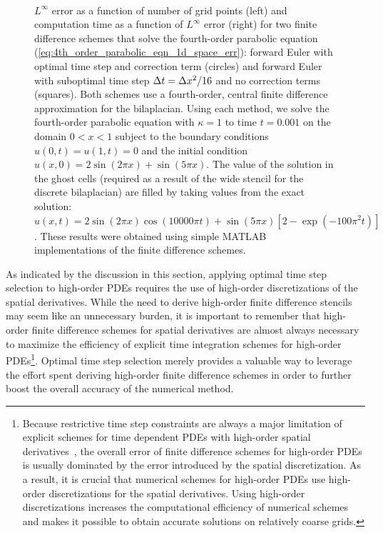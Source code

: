 \documentclass[oneeqnum,onefignum,onetabnum,onethmnum]{siamltex}
\begin{document}
\begin{figure}[tb]
\begin{center}
\ \ 
\caption{$L^\infty$ error as a function of number of grid points (left)
and computation time as a function of $L^\infty$ error (right) for two 
finite difference schemes that solve the fourth-order parabolic equation 
(\ref{eq:4th_order_parabolic_eqn_1d_space_err}):
forward Euler with optimal time step and correction term (circles)
and forward Euler with suboptimal time step $\Delta t = \Delta x^2/16$ and no 
correction terms (squares).
Both schemes use a fourth-order, central finite difference approximation for
the bilaplacian.  Using each method, we solve the fourth-order parabolic
equation with $\kappa = 1$ to time $t = 0.001$ on the domain $0 < x < 1
$ subject to the boundary conditions $u(0,t) = u(1,t) = 0$ and the initial 
condition $u(x,0) = 2\sin(2 \pi x) + \sin(5 \pi x)$.  The value of the solution
in the ghost cells (required as a result of the wide stencil for the 
discrete bilaplacian) are filled by taking values from the exact solution: 
$u(x,t) = 2\sin(2 \pi x)\cos(10000 \pi t) 
        + \sin(5 \pi x) \left[ 2-\exp(-100\pi^2 t) \right]$.
These results were obtained using simple MATLAB implementations of the 
finite difference schemes.
}
\label{fig:4th_order_parabolic_eqn_1d_error}
\end{center}
\end{figure}

As indicated by the discussion in this section, applying optimal time step 
selection to high-order PDEs requires the use of high-order discretizations
of the spatial derivatives.  While the need to derive high-order finite 
difference stencils may seem like an unnecessary burden, it is important
to remember that high-order finite difference schemes for spatial derivatives
are almost always necessary to maximize the efficiency of explicit time
integration schemes for high-order PDEs\footnote{Because restrictive time 
step constraints are always a major limitation of explicit schemes for 
time dependent PDEs with high-order spatial 
derivatives~\cite{gko_book,greer_2006}, 
the overall error of finite difference schemes for high-order PDEs is usually 
dominated by the error introduced by the spatial discretization.  As a result, 
it is crucial that numerical schemes for high-order PDEs use high-order 
discretizations for the spatial derivatives.  Using high-order discretizations 
increases the computational efficiency of numerical schemes and makes it 
possible to obtain accurate solutions on relatively coarse grids.}. 
Optimal time step selection merely provides a valuable way to leverage the 
effort spent deriving high-order finite difference schemes in order to further 
boost the overall accuracy of the numerical method.
\end{document}

